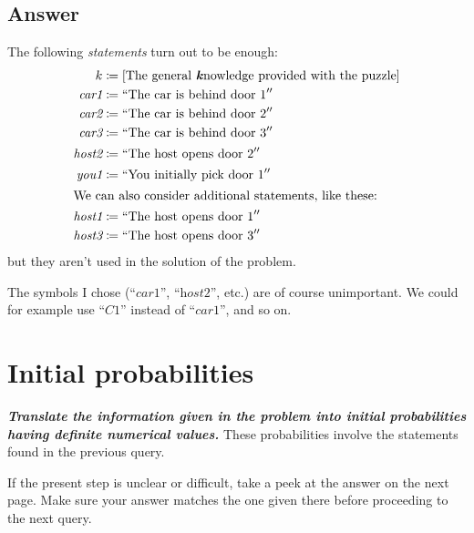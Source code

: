 \documentclass[\ifafour a4paper,12pt,\else a5paper,10pt,\fi%
onecolumn,oneside,article,%
british%
]{memoir}
\newcommand*{\defquote}[1]{``#1''}
\theoremstyle{remark}
\theoremstyle{innote}
\newcommand{\addsubsec}[1]{\subsection*{#1}\addcontentsline{toc}{subsection}{#1}}
\newcommand*{\defd}{\coloneqq}
\renewcommand*{\|}{\nonscript\,\vert\nonscript\;\mathopen{}}
\newcommand*{\etc}{{etc.}}
\newcommand*{\cara}{\textit{car1}}
\newcommand*{\carb}{\textit{car2}}
\newcommand*{\carc}{\textit{car3}}
\newcommand*{\hosta}{\textit{host1}}
\newcommand*{\hostb}{\textit{host2}}
\newcommand*{\hostc}{\textit{host3}}
\newcommand*{\youa}{\textit{you1}}
\newcommand*{\quest}[1]{\emph{\textbf{\color{mygreen}#1}}}
\begin{document}
\addsubsec{Answer}

The following \emph{statements} turn out to be enough:
\begin{align}
  \label{eq:statements}
  &\begin{aligned}
    k &\defd\text{[The general \emph{\textbf{k}}nowledge provided with the puzzle]}
    \\
    \cara&\defd\defquote{\text{The car is behind door 1}}\\
    \carb&\defd\defquote{\text{The car is behind door 2}}\\
    \carc&\defd\defquote{\text{The car is behind door 3}}\\[0.5\jot]
    \hostb&\defd\defquote{\text{The host opens door 2}}\\[0.5\jot]
    \youa&\defd\defquote{\text{You initially pick door 1}}
  \end{aligned}
\\\intertext{We can also consider additional statements, like these:}
  \label{eq:statements2}
  &\begin{aligned}
    \hosta&\defd\defquote{\text{The host opens door 1}}\\
    \hostc&\defd\defquote{\text{The host opens door 3}}
  \end{aligned}
\end{align}
but they aren't used in the solution of the problem.

\medskip

The symbols I chose (\enquote{$\cara$}, \enquote{$\hostb$}, \etc) are of
course unimportant. We could for example use \enquote{$\textit{C1}$}
instead of \enquote{$\cara$}, and so on.

\clearpage

\section{Initial probabilities}
\label{sec:init_probs}



\quest{Translate the information given in the problem into initial
  probabilities having definite numerical values.} These probabilities
involve the statements found in the previous query.

\medskip

If the present step is unclear or difficult, take a peek at the answer on
the next page. Make sure your answer matches the one given there before
proceeding to the next query.
\end{document}
